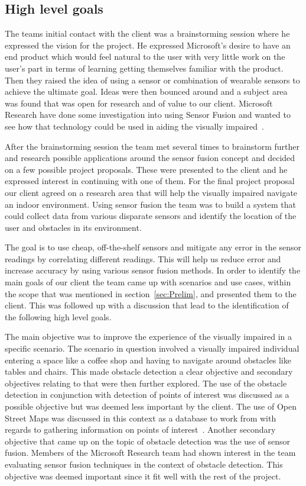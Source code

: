 \documentclass[prodmode,acmtosem]{acmsmall} %
\begin{document}
\subsection{High level goals}
The teams initial contact with the client was a brainstorming session where he expressed the vision for the project. He expressed Microsoft's desire to have an end product which would feel natural to the user with very little work on the user's part in terms of learning getting themselves familiar with the product. Then they raised the idea of using a sensor or combination of wearable sensors to achieve the ultimate goal. Ideas were then bounced around and a subject area was found that was open for research and of value to our client.
Microsoft Research have done some investigation into using Sensor Fusion and wanted to see how that technology could be used in aiding the visually impaired~\cite{Gear2012}.

After the brainstorming session the team met several times to brainstorm further and research possible applications around the sensor fusion concept and decided on a few possible project proposals.
These were presented to the client and he expressed interest in continuing with one of them.
For the final project proposal our client agreed on a research area that will help the visually impaired navigate an indoor environment.
Using sensor fusion the team was to build a system that could collect data from various disparate sensors and identify the location of the user and obstacles in its environment.

The goal is to use cheap, off-the-shelf sensors and mitigate any error in the sensor readings by correlating different readings. This will help us reduce error and increase accuracy by using various sensor fusion methods.
In order to identify the main goals of our client the team came up with scenarios and use cases, within the scope that was mentioned in section~\ref{sec:Prelim}, and presented them to the client. This was followed up with a discussion that lead to the identification of the following high level goals.


The main objective was to improve the experience of the visually impaired in a specific scenario. The scenario in question involved a visually impaired individual entering a space like a coffee shop and having to navigate around obstacles like tables and chairs.
This made obstacle detection a clear objective and secondary objectives relating to that were then further explored. The use of the obstacle detection in conjunction with detection of points of interest was discussed as a possible objective but was deemed less important by the client.
The use of Open Street Maps was discussed in this context as a database to work from with regards to gathering information on points of interest~\cite{OSM}.
Another secondary objective that came up on the topic of obstacle detection was the use of sensor fusion. Members of the Microsoft Research team had shown interest in the team evaluating sensor fusion techniques in the context of obstacle detection. This objective was deemed important since it fit well with the rest of the project.
\end{document}
